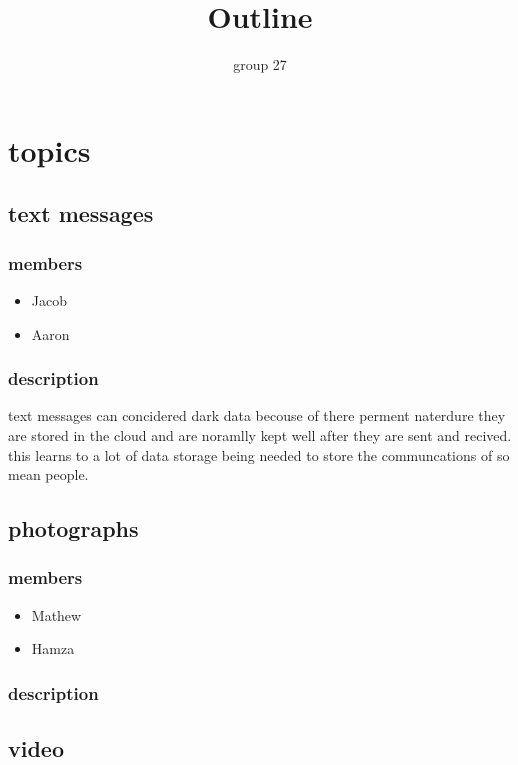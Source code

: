 \documentclass{article}
\begin{document}
\title{Outline}
\author{group 27}

\maketitle
\newpage


\section{topics}
\subsection{text messages} 
\subsubsection{members}
\begin{itemize}
    \item Jacob
    \item Aaron
\end{itemize}
\subsubsection{description}
 text messages can concidered dark data becouse of there perment naterdure they are stored in the cloud and 
 are noramlly kept well after they are sent and recived. this learns to a lot of data storage being needed to
 store the communcations of so mean people.

\subsection{photographs}
\subsubsection{members}
\begin{itemize}
    \item Mathew
    \item Hamza
\end{itemize}
\subsubsection{description}

\subsection{video}
\end{document}

